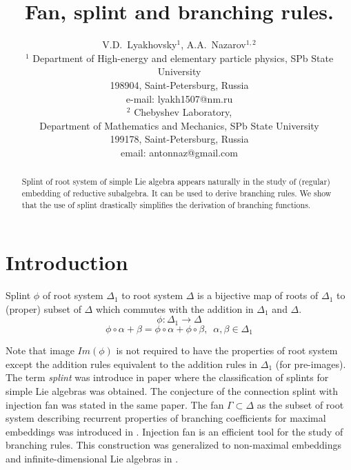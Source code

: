 \documentclass[12pt]{article}
\begin{document}
\title{Fan, splint and branching rules.}



\author{V.D.~Lyakhovsky$^1$, A.A.~Nazarov$^{1,2}$ \\
  {\small $^1$ Department of High-energy and elementary particle physics, SPb State University}\\
  {\small 198904, Saint-Petersburg, Russia}\\
  {\small e-mail: lyakh1507@nm.ru}\\
  {\small$^{2}$ Chebyshev Laboratory,}\\
  {\small Department of Mathematics and Mechanics, SPb State University}\\
  {\small 199178, Saint-Petersburg, Russia}\\
  {\small email: antonnaz@gmail.com}}
\maketitle

\begin{abstract}
Splint of root system of simple Lie algebra appears naturally in the study of (regular) embedding of reductive subalgebra. It can be used to derive branching rules. We show that the use of splint drastically simplifies the derivation of branching functions. 
\end{abstract}


\section{Introduction}
\label{sec:Introduction} 
Splint $\phi$ of root system $\Delta_1$ to root system $\Delta$ is a bijective map of roots of $\Delta_{1}$ to (proper) subset of $\Delta$ which commutes with the addition in $\Delta_{1}$ and $\Delta$. 
\begin{equation*}
\phi:\Delta_1 \longrightarrow \Delta
\end{equation*}
\begin{equation*}
\phi \circ \alpha + \beta =\phi \circ \alpha + \phi \circ \beta,
\,\,\, \alpha,\beta \in \Delta_1
\end{equation*}

Note that image $Im(\phi)$ is not required to have the properties of root system except the addition rules equivalent to the addition rules in $\Delta_{1}$ (for pre-images). The term {\it splint} was introduce in paper \cite{richter2008splints} where the classification of splints for simple Lie algebras was obtained. The conjecture of the connection splint with injection fan was stated in the same paper. 
The fan $\Gamma \subset \Delta$ as the subset of root system describing recurrent properties of branching coefficients for maximal embeddings  was introduced in \cite{lyakhovsky1996rra}. Injection fan is an efficient tool for the study of branching rules. This construction was generalized to non-maximal embeddings and infinite-dimensional Lie algebras in  \cite{2010arXiv1007.0318L, ilyin812pbc}.
\end{document}
